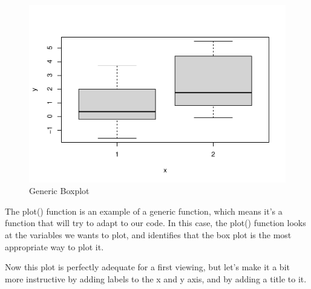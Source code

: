\documentclass[
]{book}
\newenvironment{Shaded}{\begin{snugshade}}{\end{snugshade}}
\newcommand{\AttributeTok}[1]{\textcolor[rgb]{0.13,0.29,0.53}{#1}}
\newcommand{\FunctionTok}[1]{\textcolor[rgb]{0.13,0.29,0.53}{\textbf{#1}}}
\newcommand{\NormalTok}[1]{#1}
\newcommand{\SpecialCharTok}[1]{\textcolor[rgb]{0.81,0.36,0.00}{\textbf{#1}}}
\newcommand{\StringTok}[1]{\textcolor[rgb]{0.31,0.60,0.02}{#1}}
\begin{document}
\begin{figure}
\centering
\includegraphics{gitbook-demo_files/figure-latex/unnamed-chunk-8-1.pdf}
\caption{\label{fig:unnamed-chunk-8}Generic Boxplot}
\end{figure}

The plot() function is an example of a generic function, which means it's a function that will try to adapt to our code. In this case, the plot() function looks at the variables we wants to plot, and identifies that the box plot is the most appropriate way to plot it.

Now this plot is perfectly adequate for a first viewing, but let's make it a bit more instructive by adding labels to the x and y axis, and by adding a title to it.

\begin{Shaded}
\end{Shaded}
\end{document}
